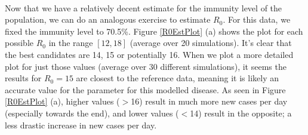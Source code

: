 \documentclass[runningheads]{llncs}
\begin{document}
\paragraph{} Now that we have a relatively decent estimate for the immunity level of the population, we can do an analogous exercise to estimate $R_0$. For this data, we fixed the immunity level to 70.5\%. Figure \ref{R0EstPlot} (a) shows the plot for each possible $R_0$ in the range $[12, 18]$ (average over 20 simulations). It's clear that the best candidates are 14, 15 or potentially 16. When we plot a more detailed plot for just those values (average over 30 different simulations), it seems the results for $R_0 = 15$ are closest to the reference data, meaning it is likely an accurate value for the parameter for this modelled disease. As seen in Figure \ref{R0EstPlot} (a), higher values ($>$16) result in much more new cases per day (especially towards the end), and lower values ($<$14) result in the opposite; a less drastic increase in new cases per day.
\end{document}

